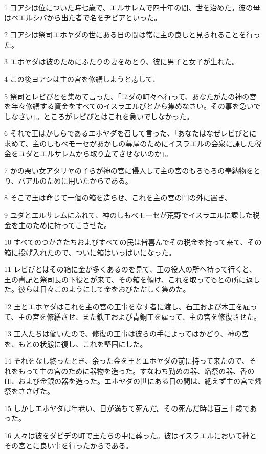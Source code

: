 \par 1 ヨアシは位についた時七歳で、エルサレムで四十年の間、世を治めた。彼の母はベエルシバから出た者で名をヂビアといった。
\par 2 ヨアシは祭司エホヤダの世にある日の間は常に主の良しと見られることを行った。
\par 3 エホヤダは彼のためにふたりの妻をめとり、彼に男子と女子が生れた。
\par 4 この後ヨアシは主の宮を修繕しようと志して、
\par 5 祭司とレビびとを集めて言った、「ユダの町々へ行って、あなたがたの神の宮を年々修繕する資金をすべてのイスラエルびとから集めなさい。その事を急いでしなさい」。ところがレビびとはこれを急いでしなかった。
\par 6 それで王はかしらであるエホヤダを召して言った、「あなたはなぜレビびとに求めて、主のしもべモーセがあかしの幕屋のためにイスラエルの会衆に課した税金をユダとエルサレムから取り立てさせないのか」。
\par 7 かの悪い女アタリヤの子らが神の宮に侵入して主の宮のもろもろの奉納物をとり、バアルのために用いたからである。
\par 8 そこで王は命じて一個の箱を造らせ、これを主の宮の門の外に置き、
\par 9 ユダとエルサレムにふれて、神のしもべモーセが荒野でイスラエルに課した税金を主のために持ってこさせた。
\par 10 すべてのつかさたちおよびすべての民は皆喜んでその税金を持って来て、その箱に投げ入れたので、ついに箱はいっぱいになった。
\par 11 レビびとはその箱に金が多くあるのを見て、王の役人の所へ持って行くと、王の書記と祭司長の下役とが来て、その箱を傾け、これを取ってもとの所に返した。彼らは日々このようにして金をおびただしく集めた。
\par 12 王とエホヤダはこれを主の宮の工事をなす者に渡し、石工および木工を雇って、主の宮を修繕させ、また鉄工および青銅工を雇って、主の宮を修復させた。
\par 13 工人たちは働いたので、修復の工事は彼らの手によってはかどり、神の宮を、もとの状態に復し、これを堅固にした。
\par 14 それをなし終ったとき、余った金を王とエホヤダの前に持って来たので、それをもって主の宮のために器物を造った。すなわち勤めの器、燔祭の器、香の皿、および金銀の器を造った。エホヤダの世にある日の間は、絶えず主の宮で燔祭をささげた。
\par 15 しかしエホヤダは年老い、日が満ちて死んだ。その死んだ時は百三十歳であった。
\par 16 人々は彼をダビデの町で王たちの中に葬った。彼はイスラエルにおいて神とその宮とに良い事を行ったからである。
